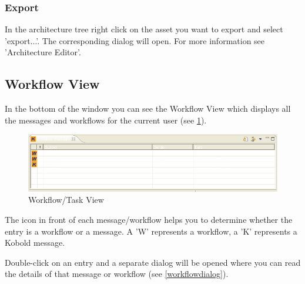 \subsubsection{Export}
In the architecture tree right click on the asset you want to export and select
'export...'. The corresponding dialog will open. For more information see
'Architecture Editor'.



\subsection{Workflow View}

In the bottom of the window you can see the Workflow View which displays all 
the messages and workflows for the current user (see \ref{workflow}). 

\begin{figure}[h!]
\begin{center}
\includegraphics[width=15cm]{workflow.png}
   \caption{Workflow/Task View}
\label{workflow}
\end{center}
\end{figure}\par

The icon in front of each message/workflow helps you to determine whether the entry is a 
workflow or a message. A 'W' represents a workflow, a 'K' represents a Kobold message.\par

Double-click on an entry and a 
separate dialog will be opened where you can read the details of that message or
workflow (see \ref{workflowdialog}).

